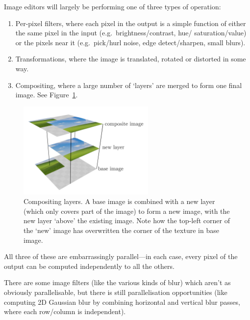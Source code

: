 \documentclass[12pt]{article}
\begin{document}
Image editors will largely be performing one of three types of operation:

\begin{enumerate}
    \item Per-pixel filters, where each pixel in the output is a simple function of either the same
        pixel in the input (e.g.\ brightness/contrast, hue/ saturation/value) or the pixels near it
        (e.g.\ pick/hurl noise, edge detect/sharpen, small blurs).
    \item Transformations, where the image is translated, rotated or distorted in some way.
    \item Compositing, where a large number of `layers' are merged to form one final image.  See
        Figure~\ref{fig:compositing}.
\end{enumerate}

\begin{figure}
    \begin{center}
        \includegraphics[width=0.6\textwidth]{compositing}
    \end{center}
    \caption{Compositing layers.  A base image is combined with a new layer (which only covers part
    of the image) to form a new image, with the new layer `above' the existing image.  Note how the
    top-left corner of the `new' image has overwritten the corner of the texture in base
    image.}\label{fig:compositing}
\end{figure}

All three of these are embarrassingly parallel---in each case, every pixel of the output can be
computed independently to all the others.

There are some image filters (like the various kinds of blur) which aren't as obviously
parallelisable, but there is still parallelisation opportunities (like computing 2D Gaussian blur by
combining horizontal and vertical blur passes, where each row/column is independent).
\end{document}
